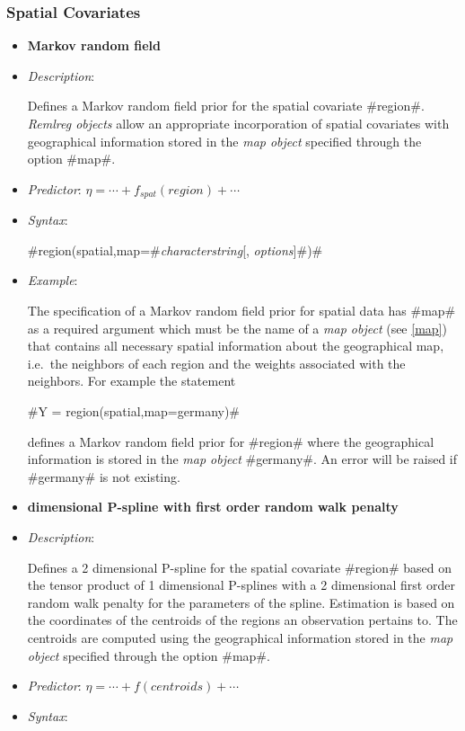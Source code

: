 \subsubsection*{Spatial Covariates}

\begin{itemize}
\item[]{\bf\sffamily Markov random field}

\item[] {\em Description}:

Defines a Markov random field prior for the spatial covariate
#region#. {\em Remlreg objects} allow an appropriate incorporation
of spatial covariates with geographical information stored in the
{\em map object} specified through the option #map#.
\item[] {\em Predictor}: $\eta = \cdots + f_{spat}(region) + \cdots$
\item[] {\em Syntax}:

#region(spatial,map=#{\em characterstring}[, {\em options}]#)#
\item[] {\em Example}:

The specification of a Markov random field prior for spatial data
has #map# as a required argument which must be the name of a {\em
map object} (see \autoref{map}) that contains all necessary
spatial information about the geographical map, i.e.~the neighbors
of each region and the weights associated with the neighbors. For
example the statement

#Y = region(spatial,map=germany)#

defines a Markov random field prior for #region# where the
geographical information is stored in the {\em map object}
#germany#. An error will be raised if #germany# is not existing.

\item[]{\bf{} dimensional P-spline with first order
random walk penalty}

\item[] {\em Description}:

Defines a 2 dimensional P-spline for the spatial covariate
#region# based on the tensor product of 1 dimensional P-splines
with a 2 dimensional first order random walk penalty for the
parameters of the spline. Estimation is based on the coordinates
of the centroids of the regions an observation pertains to. The
centroids are computed using the geographical information stored
in the {\em map object} specified through the option #map#.
\item[] {\em Predictor}: $\eta= \cdots + f(centroids) + \cdots$
\item[] {\em Syntax}:


\end{itemize}
